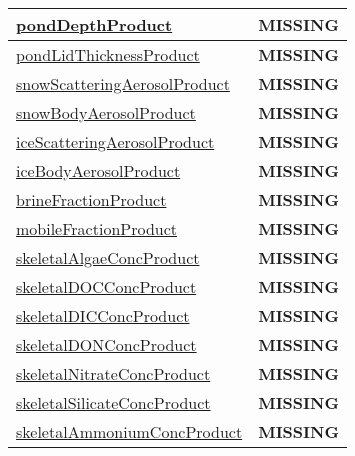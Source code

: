 {\begin{center}
\begin{longtable}{| p{2.0in} | p{4.0in} |}
    \hline
    \hyperref[subsec:var_sec_tracer_products_pondDepthProduct]{pondDepthProduct} & {\bf \color{red} MISSING} \\
    \hline
    \hyperref[subsec:var_sec_tracer_products_pondLidThicknessProduct]{pondLidThicknessProduct} & {\bf \color{red} MISSING} \\
    \hline
    \hyperref[subsec:var_sec_tracer_products_snowScatteringAerosolProduct]{snowScatteringAerosolProduct} & {\bf \color{red} MISSING} \\
    \hline
    \hyperref[subsec:var_sec_tracer_products_snowBodyAerosolProduct]{snowBodyAerosolProduct} & {\bf \color{red} MISSING} \\
    \hline
    \hyperref[subsec:var_sec_tracer_products_iceScatteringAerosolProduct]{iceScatteringAerosolProduct} & {\bf \color{red} MISSING} \\
    \hline
    \hyperref[subsec:var_sec_tracer_products_iceBodyAerosolProduct]{iceBodyAerosolProduct} & {\bf \color{red} MISSING} \\
    \hline
    \hyperref[subsec:var_sec_tracer_products_brineFractionProduct]{brineFractionProduct} & {\bf \color{red} MISSING} \\
    \hline
    \hyperref[subsec:var_sec_tracer_products_mobileFractionProduct]{mobileFractionProduct} & {\bf \color{red} MISSING} \\
    \hline
    \hyperref[subsec:var_sec_tracer_products_skeletalAlgaeConcProduct]{skeletalAlgaeConcProduct} & {\bf \color{red} MISSING} \\
    \hline
    \hyperref[subsec:var_sec_tracer_products_skeletalDOCConcProduct]{skeletalDOCConcProduct} & {\bf \color{red} MISSING} \\
    \hline
    \hyperref[subsec:var_sec_tracer_products_skeletalDICConcProduct]{skeletalDICConcProduct} & {\bf \color{red} MISSING} \\
    \hline
    \hyperref[subsec:var_sec_tracer_products_skeletalDONConcProduct]{skeletalDONConcProduct} & {\bf \color{red} MISSING} \\
    \hline
    \hyperref[subsec:var_sec_tracer_products_skeletalNitrateConcProduct]{skeletalNitrateConcProduct} & {\bf \color{red} MISSING} \\
    \hline
    \hyperref[subsec:var_sec_tracer_products_skeletalSilicateConcProduct]{skeletalSilicateConcProduct} & {\bf \color{red} MISSING} \\
    \hline
    \hyperref[subsec:var_sec_tracer_products_skeletalAmmoniumConcProduct]{skeletalAmmoniumConcProduct} & {\bf \color{red} MISSING} \\

\end{longtable}
\end{center}}
